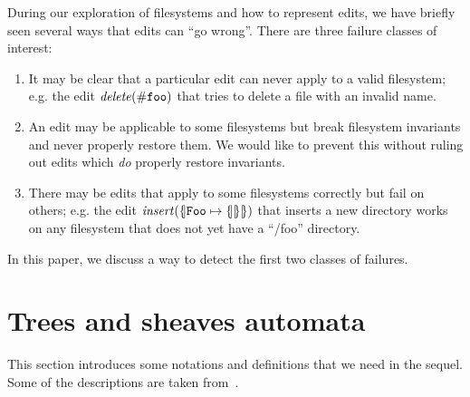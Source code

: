 During our exploration of filesystems and how to represent edits, we have
briefly seen several ways that edits can ``go wrong''. There are three
failure classes of interest:
\begin{enumerate}
    \item It may be clear that a particular edit can never apply to a valid
        filesystem; e.g. the edit $\mathit{delete}(\mathtt{\#foo})$ that tries to
        delete a file with an invalid name.
    \item An edit may be applicable to some filesystems but break filesystem
        invariants and never properly restore them. We would like to prevent
        this without ruling out edits which \emph{do} properly restore
        invariants.
    \item There may be edits that apply to some filesystems correctly but
        fail on others; e.g. the edit
        $\mathit{insert}(\{\hspace{-2pt}|\mathtt{Foo}\mapsto\{\hspace{-2pt}||\hspace{-2pt}\}|\hspace{-2pt}\})$ that inserts a
        new directory works on any filesystem that does not yet have a
        ``/foo'' directory.
\end{enumerate}
In this paper, we discuss a way to detect the first two classes of failures.

\section{Trees and sheaves automata}

This section introduces some notations and definitions that we need in the
sequel.  Some of the descriptions are taken
from~\cite{Foster:FTL}.

